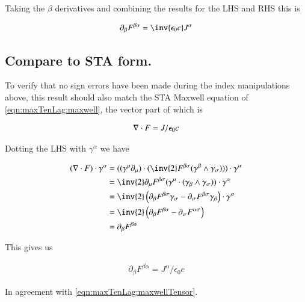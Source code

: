 Taking the $\beta$ derivatives and combining the results for the LHS and RHS this is

\begin{align}\label{eqn:maxTenLag:maxwellTensor}
\partial_\beta F^{\beta\alpha} = \inv{\epsilon_0 c} J^\alpha 
\end{align}

\subsection{Compare to STA form. }

To verify that no sign errors have been made during the index manipulations above, this result should also match
the STA Maxwell equation of \ref{eqn:maxTenLag:maxwell}, the vector part of which is

\begin{align*}
\nabla \cdot F = J/\epsilon_0 c
\end{align*}

Dotting the LHS with $\gamma^\alpha$ we have

\begin{align*}
(\grad \cdot F) \cdot \gamma^\alpha 
&=
((\gamma^\mu \partial_\mu) \cdot (\inv{2} F^{\beta\sigma} (\gamma^\beta \wedge \gamma_\sigma))) \cdot \gamma^\alpha \\
&=
\inv{2} \partial_\mu F^{\beta\sigma} 
(\gamma^\mu \cdot (\gamma_\beta \wedge \gamma_\sigma)) \cdot \gamma^\alpha \\
&=
\inv{2} 
\left( \partial_\beta F^{\beta\sigma} \gamma_\sigma -\partial_\sigma F^{\beta\sigma} \gamma_\beta \right) \cdot \gamma^\alpha \\
&=
\inv{2} 
\left( \partial_\beta F^{\beta\alpha} -\partial_\sigma F^{\alpha\sigma} \right) \\
&=
\partial_\beta F^{\beta\alpha} 
\end{align*}

This gives us

\begin{align}
\partial_\beta F^{\beta\alpha} = J^\alpha/\epsilon_0 c
\end{align}

In agreement with \ref{eqn:maxTenLag:maxwellTensor}.
